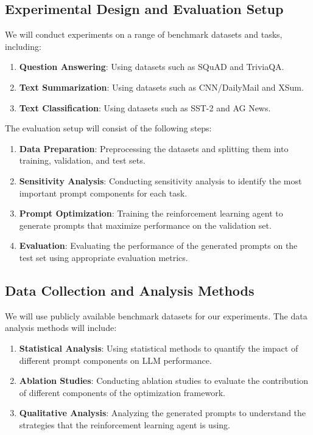 \documentclass{article}
\begin{document}
\subsection{Experimental Design and Evaluation Setup}
We will conduct experiments on a range of benchmark datasets and tasks, including:
\begin{enumerate}
    \item \textbf{Question Answering}: Using datasets such as SQuAD and TriviaQA.
    \item \textbf{Text Summarization}: Using datasets such as CNN/DailyMail and XSum.
    \item \textbf{Text Classification}: Using datasets such as SST-2 and AG News.
\end{enumerate}

The evaluation setup will consist of the following steps:
\begin{enumerate}
    \item \textbf{Data Preparation}: Preprocessing the datasets and splitting them into training, validation, and test sets.
    \item \textbf{Sensitivity Analysis}: Conducting sensitivity analysis to identify the most important prompt components for each task.
    \item \textbf{Prompt Optimization}: Training the reinforcement learning agent to generate prompts that maximize performance on the validation set.
    \item \textbf{Evaluation}: Evaluating the performance of the generated prompts on the test set using appropriate evaluation metrics.
\end{enumerate}

\subsection{Data Collection and Analysis Methods}
We will use publicly available benchmark datasets for our experiments. The data analysis methods will include:
\begin{enumerate}
    \item \textbf{Statistical Analysis}: Using statistical methods to quantify the impact of different prompt components on LLM performance.
    \item \textbf{Ablation Studies}: Conducting ablation studies to evaluate the contribution of different components of the optimization framework.
    \item \textbf{Qualitative Analysis}: Analyzing the generated prompts to understand the strategies that the reinforcement learning agent is using.
\end{enumerate}
\end{document}
